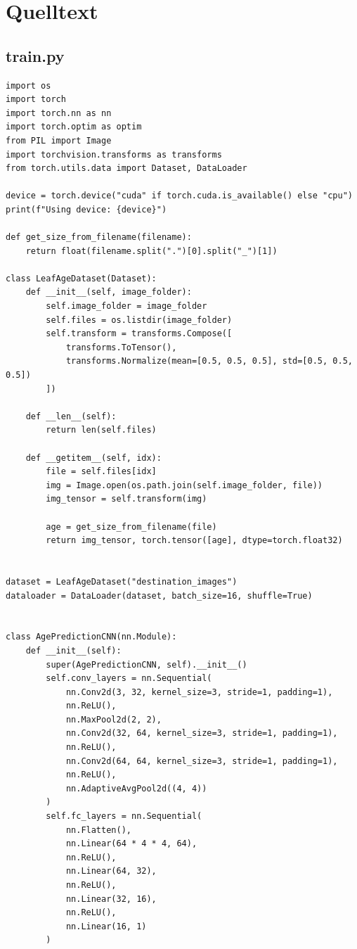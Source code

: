 \section{Quelltext}
\subsection{train.py}
\begin{verbatim}
import os
import torch
import torch.nn as nn
import torch.optim as optim
from PIL import Image
import torchvision.transforms as transforms
from torch.utils.data import Dataset, DataLoader

device = torch.device("cuda" if torch.cuda.is_available() else "cpu")
print(f"Using device: {device}")

def get_size_from_filename(filename):
    return float(filename.split(".")[0].split("_")[1])

class LeafAgeDataset(Dataset):
    def __init__(self, image_folder):
        self.image_folder = image_folder
        self.files = os.listdir(image_folder)
        self.transform = transforms.Compose([
            transforms.ToTensor(),
            transforms.Normalize(mean=[0.5, 0.5, 0.5], std=[0.5, 0.5, 0.5])
        ])

    def __len__(self):
        return len(self.files)

    def __getitem__(self, idx):
        file = self.files[idx]
        img = Image.open(os.path.join(self.image_folder, file))
        img_tensor = self.transform(img)

        age = get_size_from_filename(file)
        return img_tensor, torch.tensor([age], dtype=torch.float32)


dataset = LeafAgeDataset("destination_images")
dataloader = DataLoader(dataset, batch_size=16, shuffle=True)


class AgePredictionCNN(nn.Module):
    def __init__(self):
        super(AgePredictionCNN, self).__init__()
        self.conv_layers = nn.Sequential(
            nn.Conv2d(3, 32, kernel_size=3, stride=1, padding=1),
            nn.ReLU(),
            nn.MaxPool2d(2, 2),
            nn.Conv2d(32, 64, kernel_size=3, stride=1, padding=1),
            nn.ReLU(),
            nn.Conv2d(64, 64, kernel_size=3, stride=1, padding=1),
            nn.ReLU(),
            nn.AdaptiveAvgPool2d((4, 4))
        )
        self.fc_layers = nn.Sequential(
            nn.Flatten(),
            nn.Linear(64 * 4 * 4, 64),
            nn.ReLU(),
            nn.Linear(64, 32),
            nn.ReLU(),
            nn.Linear(32, 16),
            nn.ReLU(),
            nn.Linear(16, 1)
        )


\end{verbatim}
